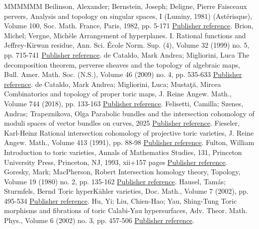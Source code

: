 \begin{thebibliography}{MMMMMM}
 Beilinson, Alexander; Bernstein, Joseph; Deligne, Pierre Faisceaux pervers, Analysis and topology on singular spaces, I (Luminy, 1981) (Astérisque), Volume 100, Soc. Math. France, Paris, 1982, pp. 5-171 \href{https://alco.centre-mersenne.org/articles/10.5802/alco.417/#BBD}{Publisher reference}.
 Brion, Michel; Vergne, Michèle Arrangement of hyperplanes. I. Rational functions and Jeffrey-Kirwan residue, Ann. Sci. École Norm. Sup. (4), Volume 32 (1999) no. 5, pp. 715-741 \href{https://alco.centre-mersenne.org/articles/10.5802/alco.417/#BV}{Publisher reference}.
 de Cataldo, Mark Andrea; Migliorini, Luca The decomposition theorem, perverse sheaves and the topology of algebraic maps, Bull. Amer. Math. Soc. (N.S.), Volume 46 (2009) no. 4, pp. 535-633 \href{https://alco.centre-mersenne.org/articles/10.5802/alco.417/#dCMdec}{Publisher reference}.
 de Cataldo, Mark Andrea; Migliorini, Luca; Mustaţă, Mircea Combinatorics and topology of proper toric maps, J. Reine Angew. Math., Volume 744 (2018), pp. 133-163 \href{https://alco.centre-mersenne.org/articles/10.5802/alco.417/#dCMMtor}{Publisher reference}.
 Felisetti, Camilla; Szenes, Andras; Trapeznikova, Olga Parabolic bundles and the intersection cohomology of moduli spaces of vector bundles on curves, 2025 \href{https://alco.centre-mersenne.org/articles/10.5802/alco.417/#cfotasz}{Publisher reference}.
 Fieseler, Karl-Heinz Rational intersection cohomology of projective toric varieties, J. Reine Angew. Math., Volume 413 (1991), pp. 88-98 \href{https://alco.centre-mersenne.org/articles/10.5802/alco.417/#Fiesler}{Publisher reference}.
 Fulton, William Introduction to toric varieties, Annals of Mathematics Studies, 131, Princeton University Press, Princeton, NJ, 1993, xii+157 pages \href{https://alco.centre-mersenne.org/articles/10.5802/alco.417/#Fulton}{Publisher reference}.
 Goresky, Mark; MacPherson, Robert Intersection homology theory, Topology, Volume 19 (1980) no. 2, pp. 135-162 \href{https://alco.centre-mersenne.org/articles/10.5802/alco.417/#GM}{Publisher reference}.
 Hausel, Tamás; Sturmfels, Bernd Toric hyperKähler varieties, Doc. Math., Volume 7 (2002), pp. 495-534 \href{https://alco.centre-mersenne.org/articles/10.5802/alco.417/#HSt}{Publisher reference}.
 Hu, Yi; Liu, Chien-Hao; Yau, Shing-Tung Toric morphisms and fibrations of toric Calabi-Yau hypersurfaces, Adv. Theor. Math. Phys., Volume 6 (2002) no. 3, pp. 457-506 \href{https://alco.centre-mersenne.org/articles/10.5802/alco.417/#Yau}{Publisher reference}.

\end{thebibliography}
